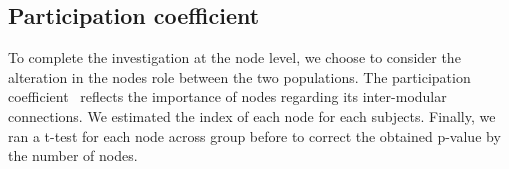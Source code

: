 \subsection{Participation coefficient}
To complete the investigation at the node level, we choose to consider the alteration in the nodes role between the two populations.
The participation coefficient~\cite{guimera2005} reflects the importance of nodes regarding its inter-modular connections.
We estimated the index of each node for each subjects.
Finally, we ran a t-test for each node across group before to correct the obtained p-value by the number of nodes.
